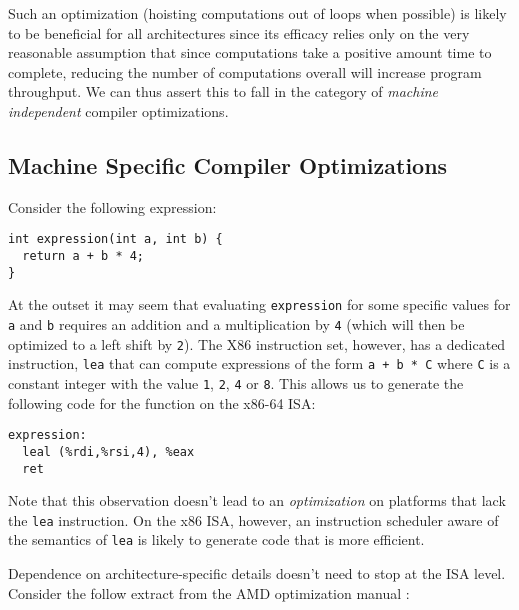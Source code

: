 Such an optimization (hoisting computations out of loops when
possible) is likely to be beneficial for all architectures since its
efficacy relies only on the very reasonable assumption that since
computations take a positive amount time to complete, reducing the
number of computations overall will increase program throughput.  We
can thus assert this to fall in the category of \textit{machine
  independent} compiler optimizations.

\subsection{Machine Specific Compiler Optimizations}

Consider the following expression:

\begin{verbatim}
int expression(int a, int b) {
  return a + b * 4;
}
\end{verbatim}

At the outset it may seem that evaluating \texttt{expression} for some
specific values for \texttt{a} and \texttt{b} requires an addition and
a multiplication by \texttt{4} (which will then be optimized to a left
shift by \texttt{2}).  The X86 instruction set, however, has a
dedicated instruction, \texttt{lea} that can compute expressions of
the form \texttt{a + b * C} where \texttt{C} is a constant integer
with the value \texttt{1}, \texttt{2}, \texttt{4} or \texttt{8}.  This
allows us to generate the following code for the function on the
x86-64 ISA:

\begin{verbatim}
expression:
  leal (%rdi,%rsi,4), %eax
  ret
\end{verbatim}

Note that this observation doesn't lead to an \textit{optimization} on
platforms that lack the \texttt{lea} instruction.  On the x86 ISA,
however, an instruction scheduler aware of the semantics of
\texttt{lea} is likely to generate code that is more efficient.

Dependence on architecture-specific details doesn't need to stop at
the ISA level.  Consider the follow extract from the AMD optimization
manual \cite[Section ~6.2]{amd64opt}:

